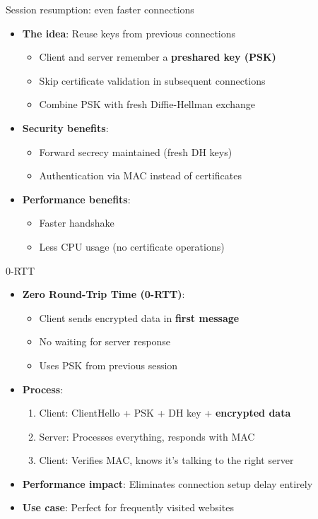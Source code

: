 \ifdefined\PRESENTATION\else\PassOptionsToClass{handout}{beamer}\fi\documentclass[aspectratio=169, lualatex]{beamer}
\begin{document}
\begin{frame}{Session resumption: even faster connections}
	\begin{itemize}
		\item \textbf{The idea}: Reuse keys from previous connections
		      \begin{itemize}
			      \item Client and server remember a \textbf{preshared key (PSK)}
			      \item Skip certificate validation in subsequent connections
			      \item Combine PSK with fresh Diffie-Hellman exchange
		      \end{itemize}
		\item \textbf{Security benefits}:
		      \begin{itemize}
			      \item Forward secrecy maintained (fresh DH keys)
			      \item Authentication via MAC instead of certificates
		      \end{itemize}
		\item \textbf{Performance benefits}:
		      \begin{itemize}
			      \item Faster handshake
			      \item Less CPU usage (no certificate operations)
		      \end{itemize}
	\end{itemize}
\end{frame}

\begin{frame}{0-RTT}
	\begin{itemize}
		\item \textbf{Zero Round-Trip Time (0-RTT)}:
		      \begin{itemize}
			      \item Client sends encrypted data in \textbf{first message}
			      \item No waiting for server response
			      \item Uses PSK from previous session
		      \end{itemize}
		\item \textbf{Process}:
		      \begin{enumerate}
			      \item Client: ClientHello + PSK + DH key + \textbf{encrypted data}
			      \item Server: Processes everything, responds with MAC
			      \item Client: Verifies MAC, knows it's talking to the right server
		      \end{enumerate}
		\item \textbf{Performance impact}: Eliminates connection setup delay entirely
		\item \textbf{Use case}: Perfect for frequently visited websites
	\end{itemize}
\end{frame}
\end{document}
